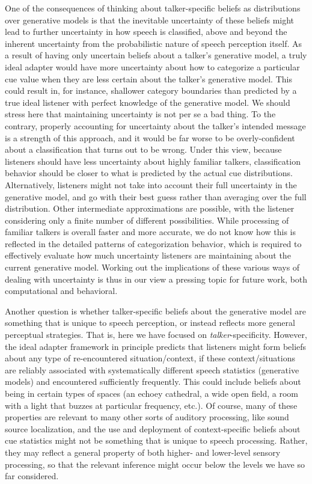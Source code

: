 One of the consequences of thinking about talker-specific beliefs as distributions over generative models is that the inevitable uncertainty of these beliefs might lead to further uncertainty in how speech is classified, above and beyond the inherent uncertainty from the probabilistic nature of speech perception itself.  As a result of having only uncertain beliefs about a talker's generative model, a truly ideal adapter would have more uncertainty about how to categorize a particular cue value when they are less certain about the talker's generative model.  This could result in, for instance, shallower category boundaries than predicted by a true ideal listener with perfect knowledge of the generative model.  We should stress here that maintaining uncertainty is not per se a bad thing.  To the contrary, properly accounting for uncertainty about the talker's intended message is a strength of this approach, and it would be far worse to be overly-confident about a classification that turns out to be wrong.  Under this view, because listeners should have less uncertainty about highly familiar talkers, classification behavior should be closer to what is predicted by the actual cue distributions.  Alternatively, listeners might not take into account their full uncertainty in the generative model, and go with their best guess rather than averaging over the full distribution.  Other intermediate approximations are possible, with the listener considering only a finite number of different possibilities.  
While processing of familiar talkers is overall faster and more accurate, we do not know how this is reflected in the detailed patterns of categorization behavior, which is required to effectively evaluate how much uncertainty listeners are maintaining about the current generative model.
Working out the implications of these various ways of dealing with uncertainty is thus in our view a pressing topic for future work, both computational and behavioral.  

\label{r4-context-specific-adaptation}
Another question is whether talker-specific beliefs about the generative model are something that is unique to speech perception, or instead reflects more general perceptual strategies.  That is, here we have focused on \emph{talker}-specificity. However, the ideal adapter framework in principle predicts that listeners might form beliefs about any type of re-encountered situation/context, if these context/situations are reliably associated with systematically different speech statistics (generative models) and encountered sufficiently frequently. This could include beliefs about being in certain types of spaces (an echoey cathedral, a wide open field, a room with a light that buzzes at particular frequency, etc.).  Of course, many of these properties are relevant to many other sorts of auditory processing, like sound source localization, and the use and deployment of context-specific beliefs about cue statistics might not be something that is unique to speech processing.  Rather, they may reflect a general property of both higher- and lower-level sensory processing, so that the relevant inference might occur below the levels we have so far considered.  


